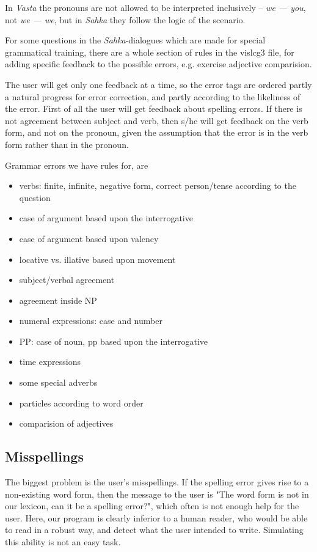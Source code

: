 \documentclass[11pt]{article}
\begin{document}
In \textit{Vasta} the pronouns are not allowed to be interpreted inclusively -- \textit{we — you}, not \textit{we — we}, but in \textit{Sahka} they follow the logic of the scenario.

For some questions in the \textit{Sahka}-dialogues which are made for special grammatical training, there are a whole section of rules in the vislcg3 file, for adding specific feedback to the possible errors, e.g. exercise adjective comparision.

The user will get only one feedback at a time, so the error tags are ordered partly a natural progress for error correction, and partly according to the likeliness of the error. First of all the user will get feedback about spelling errors. If there is not agreement between subject and verb, then s/he will get feedback on the verb form, and not on the pronoun, given the assumption that the error is in the verb form rather than in the pronoun.

Grammar errors we have rules for, are
\begin{itemize}
\setlength{\itemsep}{-0.2cm}
\item verbs: finite, infinite, negative form, correct person/tense according to the question
\item case of argument based upon the interrogative 
\item case of argument based upon valency
\item locative vs. illative based upon movement
\item subject/verbal agreement
\item agreement inside NP 
\item numeral expressions: case and number 
\item PP: case of noun, pp based upon the interrogative 
\item time expressions 
\item some special adverbs 
\item particles according to word order
\item comparision of adjectives
\end{itemize}

\subsection{Misspellings}
The biggest problem is the user's misspellings. If the spelling error gives rise to a non-existing word form, then the message to the user is "The word form is not in our lexicon, can it be a spelling error?", which often is not enough help for the user. Here, our program is clearly inferior to a human reader, who would be able to read in a robust way, and detect what the user intended to write. Simulating this ability is not an easy task.
 
\end{document}
